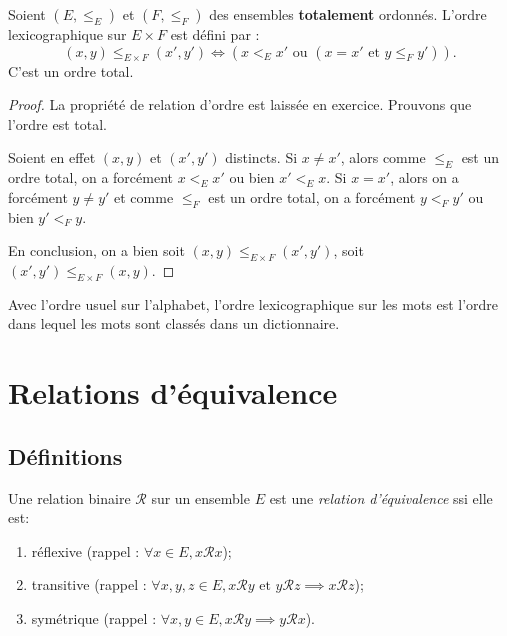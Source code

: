 \begin{propdef}
Soient $(E,\leq_E)$ et $(F,\leq_F)$ des ensembles \textbf{totalement} ordonnés.
L'ordre lexicographique sur $E\times F$ est défini par :
\[
(x,y) \leq_{E\times F} (x',y') \iff \left(x<_E x' \text{ ou } (x=x' \text{ et } y\leq_F y')\right).
\]
C'est un ordre total.
\end{propdef}
\begin{proof}
La propriété de relation d'ordre est laissée en exercice. Prouvons que l'ordre est total.

Soient en effet $(x,y)$ et $(x',y')$ distincts.
Si $x\neq x'$, alors comme $\leq_E$ est un ordre total, on a forcément $x<_E x'$ ou bien $x'<_E x$.
Si $x=x'$, alors on a forcément $y\neq y'$ et comme $\leq_F$ est un ordre total, on a forcément $y <_F y'$ ou bien $y'<_F y$.

En conclusion, on a bien soit $(x,y) \leq_{E\times F} (x',y')$, soit  $(x',y') \leq_{E\times F} (x,y)$.
\end{proof}

\begin{exemple}
Avec l'ordre usuel sur l'alphabet, l'ordre lexicographique sur les mots est l'ordre dans lequel les mots sont classés dans un dictionnaire.
\end{exemple}








\section{Relations d'équivalence}

\subsection{Définitions}

\begin{definition}
Une relation binaire ${\mathcal R}$ sur un ensemble $E$ est une \emph{relation d'équivalence} ssi elle est:
\begin{enumerate}
\item réflexive (rappel : $\forall x\in E, x{\mathcal R}x$);
\item transitive (rappel : $\forall x, y, z\in E, x{\mathcal R}y\text{ et } y{\mathcal R}z \implies x{\mathcal R}z$);
\item symétrique (rappel : $\forall x, y\in E, x{\mathcal R}y \implies y{\mathcal R}x$).
\end{enumerate}
\end{definition}

